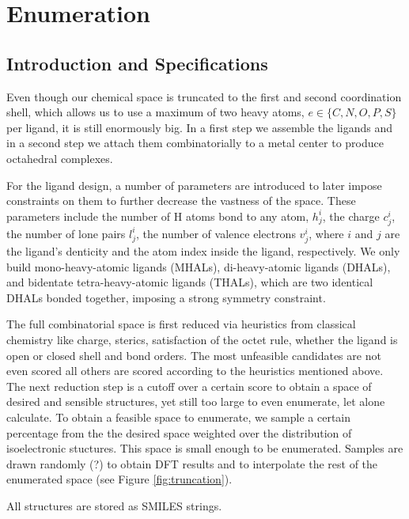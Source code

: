 \section{Enumeration}

\subsection{Introduction and Specifications}
Even though our chemical space is truncated to the first and second coordination shell, which allows us to use a maximum of two heavy atoms, $e \in \{C,N,O,P,S\} $ per ligand, it is still enormously big. In a first step we assemble the ligands and in a second step we attach them combinatorially to a metal center to produce octahedral complexes. 

For the ligand design, a number of parameters are introduced to later impose constraints on them to further decrease the vastness of the space. These parameters include the number of H atoms bond to any atom, $h^i_j$, the charge $c^i_j$, the number of lone pairs $l^i_j$, the number of valence electrons $v^i_j$, where $i$ and $j$ are the ligand's denticity and the atom index inside the ligand, respectively. We only build mono-heavy-atomic ligands (MHALs), di-heavy-atomic ligands (DHALs), and bidentate tetra-heavy-atomic ligands (THALs), which are two identical DHALs bonded together, imposing a strong symmetry constraint.

The full combinatorial space is first reduced via heuristics from classical chemistry like charge, sterics, satisfaction of the octet rule, whether the ligand is open or closed shell and bond orders. The most unfeasible candidates are not even scored all others are scored according to the heuristics mentioned above. The next reduction step is a cutoff over a certain score to obtain a space of desired and sensible structures, yet still too large to even enumerate, let alone calculate. To obtain a feasible space to enumerate, we sample a certain percentage from the the desired space weighted over the distribution of isoelectronic stuctures. This space is small enough to be enumerated. Samples are drawn randomly (?) to obtain DFT results and to interpolate the rest of the enumerated space (see Figure \ref{fig:truncation}).

All structures are stored as SMILES strings. 
 
